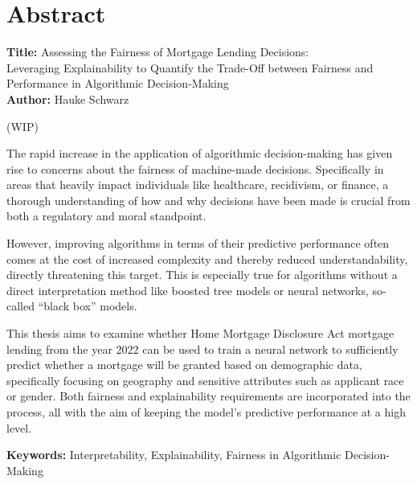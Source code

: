 \chapter*{Abstract}\label{abstract}

\noindent
\textbf{Title:} Assessing the Fairness of Mortgage Lending Decisions: \\
Leveraging Explainability to Quantify the Trade-Off between Fairness and Performance in Algorithmic Decision-Making \\ 
\textbf{Author:} Hauke Schwarz
\vspace{1em}

(WIP)

The rapid increase in the application of algorithmic decision-making has given rise to concerns about the fairness of machine-made decisions. Specifically in areas that heavily impact individuals like healthcare, recidivism, or finance, a thorough understanding of how and why decisions have been made is crucial from both a regulatory and moral standpoint.

However, improving algorithms in terms of their predictive performance often comes at the cost of increased complexity and thereby reduced understandability, directly threatening this target. This is especially true for algorithms without a direct interpretation method like boosted tree models or neural networks, so-called “black box” models.

This thesis aims to examine whether Home Mortgage Disclosure Act mortgage lending from the year 2022 can be used to train a neural network to sufficiently predict whether a mortgage will be granted based on demographic data, specifically focusing on geography and sensitive attributes such as applicant race or gender. Both fairness and explainability requirements are incorporated into the process, all with the aim of keeping the model’s predictive performance at a high level.


\vspace{3em}

\textbf{Keywords:} Interpretability, Explainability, Fairness in Algorithmic Decision-Making \\